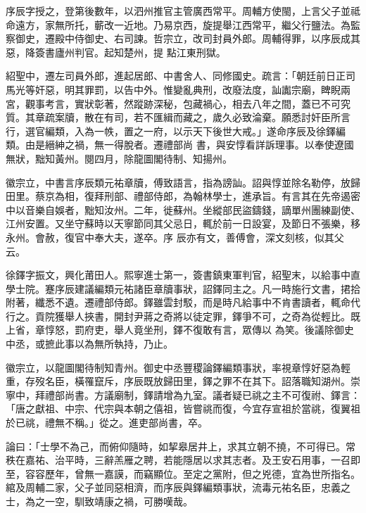 \begin{pinyinscope}
 序辰字授之，登第後數年，以泗州推官主管廣西常平。周輔方使閩，上言父子並祗命遠方，家無所托，蘄改一近地。乃易京西，旋提舉江西常平，繼父行鹽法。為監察御史，遷殿中侍御史、右司諫。哲宗立，改司封員外郎。周輔得罪，以序辰成其惡，降簽書廬州判官。起知楚州，提
 點江東刑獄。



 紹聖中，遷左司員外郎，進起居郎、中書舍人、同修國史。疏言：「朝廷前日正司馬光等奸惡，明其罪罰，以告中外。惟變亂典刑，改廢法度，訕讟宗廟，睥睨兩宮，觀事考言，實狀彰著，然蹤跡深秘，包藏禍心，相去八年之間，蓋已不可究質。其章疏案牘，散在有司，若不匯緝而藏之，歲久必致淪棄。願悉討奸臣所言行，選官編類，入為一帙，置之一府，以示天下後世大戒。」遂命序辰及徐鐸編類。由是縉紳之禍，無一得脫者。遷禮部尚
 書，與安惇看詳訴理事。以奉使遼國無狀，黜知黃州。閱四月，除龍圖閣待制、知揚州。



 徽宗立，中書言序辰類元祐章牘，傅致語言，指為謗訕。詔與惇並除名勒停，放歸田里。蔡京為相，復拜刑部、禮部侍郎，為翰林學士，進承旨。有言其在先帝遏密中以音樂自娛者，黜知汝州。二年，徙蘇州。坐縱部民盜鑄錢，謫單州團練副使、江州安置。又坐守蘇時以天寧節同其父忌日，輒於前一日設宴，及節日不張樂，移永州。會赦，復官中奉大夫，遂卒。序
 辰亦有文，善傅會，深文刻核，似其父云。



 徐鐸字振文，興化莆田人。熙寧進士第一，簽書鎮東軍判官，紹聖末，以給事中直學士院。蹇序辰建議編類元祐諸臣章牘事狀，詔鐸同主之。凡一時施行文書，捃拾附著，纖悉不遺。遷禮部侍郎。鐸雖雲封駁，而是時凡給事中不肯書讀者，輒命代行之。貢院獲舉人挾書，開封尹蔣之奇將以徒定罪，鐸爭不可，之奇為從輕比。既上省，章惇怒，罰府吏，舉人竟坐刑，鐸不復敢有言，眾傳以
 為笑。後議除御史中丞，或摭此事以為無所執持，乃止。



 徽宗立，以龍圖閣待制知青州。御史中丞豐稷論鐸編類事狀，率視章惇好惡為輕重，存歿名臣，橫罹竄斥，序辰既放歸田里，鐸之罪不在其下。詔落職知湖州。崇寧中，拜禮部尚書。方議廟制，鐸請增為九室。議者疑已祧之主不可復祔、鐸言：「唐之獻祖、中宗、代宗與本朝之僖祖，皆嘗祧而復，今宜存宣祖於當祧，復翼祖於已祧，禮無不稱。」從之。進吏部尚書，卒。



 論曰：「士學不為己，而俯仰隨時，如挈皋居井上，求其立朝不撓，不可得已。常秩在嘉祐、治平時，三辭羔雁之聘，若能隱居以求其志者。及王安石用事，一召即至，容容歷年，曾無一嘉謨，而竊顯位。至定之黨附，但之兇德，宜為世所指名。綰及周輔二家，父子並同惡相濟，而序辰與鐸編類事狀，流毒元祐名臣，忠義之士，為之一空，馴致靖康之禍，可勝嘆哉。




\end{pinyinscope}
